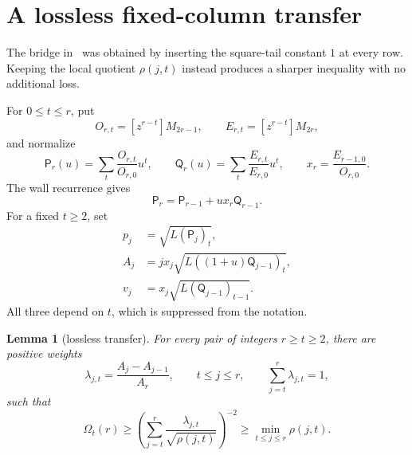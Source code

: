 \documentclass[11pt,a4paper]{article}
\theoremstyle{plain}
\newtheorem{lemma}[theorem]{Lemma}
\theoremstyle{remark}
\begin{document}
\section{A lossless fixed-column transfer}\label{sec:transfer}

The bridge in~\cite{squaretail} was obtained by inserting the square-tail
constant $1$ at every row.  Keeping the local quotient $\rho(j,t)$ instead
produces a sharper inequality with no additional loss.

For $0\le t\le r$, put
\[
 O_{r,t}=[z^{r-t}]M_{2r-1},\qquad
 E_{r,t}=[z^{r-t}]M_{2r},
\]
and normalize
\[
 \mathsf P_r(u)=\sum_t\frac{O_{r,t}}{O_{r,0}}u^t,
 \qquad
 \mathsf Q_r(u)=\sum_t\frac{E_{r,t}}{E_{r,0}}u^t,
 \qquad
 x_r=\frac{E_{r-1,0}}{O_{r,0}}.
\]
The wall recurrence gives
\begin{equation}\label{eq:PQrec}
 \mathsf P_r=\mathsf P_{r-1}+ux_r\mathsf Q_{r-1}.
\end{equation}
For a fixed $t\ge2$, set
\begin{align*}
 p_j&=\sqrt{L(\mathsf P_j)_t},\\
 A_j&=jx_j\sqrt{L((1+u)\mathsf Q_{j-1})_t},\\
 v_j&=x_j\sqrt{L(\mathsf Q_{j-1})_{t-1}}.
\end{align*}
All three depend on $t$, which is suppressed from the notation.

\begin{lemma}[lossless transfer]\label{lem:transfer}
For every pair of integers $r\ge t\ge2$, there are positive weights
\[
 \lambda_{j,t}=\frac{A_j-A_{j-1}}{A_r},
 \qquad t\le j\le r,
 \qquad \sum_{j=t}^r\lambda_{j,t}=1,
\]
such that
\begin{equation}\label{eq:transfer}
 \Omega_t(r)\ge
 \left(\sum_{j=t}^r
 \frac{\lambda_{j,t}}{\sqrt{\rho(j,t)}}\right)^{-2}
 \ge \min_{t\le j\le r}\rho(j,t).
\end{equation}
\end{lemma}
\end{document}
